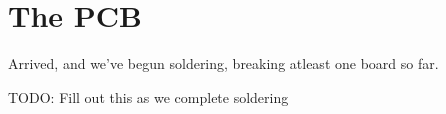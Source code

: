 \section {The PCB}

Arrived, and we've begun soldering, breaking atleast one board so far.

TODO: Fill out this as we complete soldering
